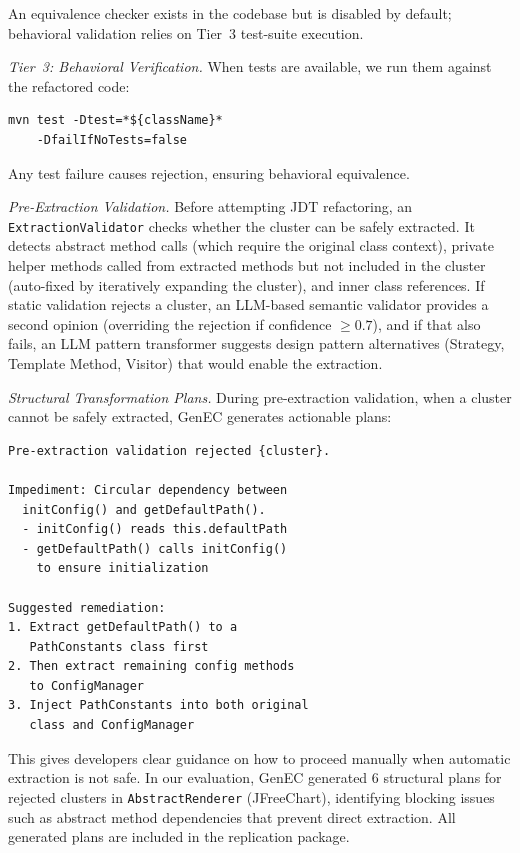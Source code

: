\documentclass[sigconf]{acmart}
\begin{document}
An equivalence checker exists in the codebase but is disabled by default;
behavioral validation relies on Tier~3 test-suite execution.

\textit{Tier~3: Behavioral Verification.}  When tests are available, we run
them against the refactored code:
\begin{lstlisting}[style=shell]
mvn test -Dtest=*${className}*
    -DfailIfNoTests=false
\end{lstlisting}
Any test failure causes rejection, ensuring behavioral equivalence.

\textit{Pre-Extraction Validation.}  Before attempting JDT refactoring, an
\texttt{ExtractionValidator} checks whether the cluster can be safely extracted.
It detects abstract method calls (which require the original class context),
private helper methods called from extracted methods but not included in the
cluster (auto-fixed by iteratively expanding the cluster), and inner class
references. If static validation rejects a cluster, an LLM-based semantic
validator provides a second opinion (overriding the rejection if confidence
$\geq 0.7$), and if that also fails, an LLM pattern transformer suggests
design pattern alternatives (Strategy, Template Method, Visitor) that would
enable the extraction.

\textit{Structural Transformation Plans.}  During pre-extraction validation,
when a cluster cannot be safely extracted, GenEC generates actionable plans:

\begin{lstlisting}[style=textblock]
Pre-extraction validation rejected {cluster}.

Impediment: Circular dependency between
  initConfig() and getDefaultPath().
  - initConfig() reads this.defaultPath
  - getDefaultPath() calls initConfig()
    to ensure initialization

Suggested remediation:
1. Extract getDefaultPath() to a
   PathConstants class first
2. Then extract remaining config methods
   to ConfigManager
3. Inject PathConstants into both original
   class and ConfigManager
\end{lstlisting}

This gives developers clear guidance on how to proceed manually when automatic
extraction is not safe. In our evaluation, GenEC generated 6 structural plans
for rejected clusters in \texttt{AbstractRenderer} (JFreeChart), identifying
blocking issues such as abstract method dependencies that prevent direct
extraction. All generated plans are included in the replication package.
\end{document}
